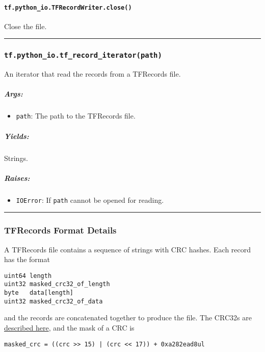 \paragraph{\texorpdfstring{\texttt{tf.python\_io.TFRecordWriter.close()}
}{tf.python\_io.TFRecordWriter.close() }}\label{tf.pythonux5fio.tfrecordwriter.close}

Close the file.

\begin{center}\rule{0.5\linewidth}{\linethickness}\end{center}

\subsubsection{\texorpdfstring{\texttt{tf.python\_io.tf\_record\_iterator(path)}
}{tf.python\_io.tf\_record\_iterator(path) }}\label{tf.pythonux5fio.tfux5frecordux5fiteratorpath}

An iterator that read the records from a TFRecords file.

\subparagraph{Args: }\label{args-2}

\begin{itemize}
\tightlist
\item
  \texttt{path}: The path to the TFRecords file.
\end{itemize}

\subparagraph{Yields: }\label{yields}

Strings.

\subparagraph{Raises: }\label{raises-1}

\begin{itemize}
\tightlist
\item
  \texttt{IOError}: If \texttt{path} cannot be opened for reading.
\end{itemize}

\begin{center}\rule{0.5\linewidth}{\linethickness}\end{center}

\subsubsection{TFRecords Format Details
}\label{tfrecords-format-details}

A TFRecords file contains a sequence of strings with CRC hashes. Each
record has the format

\begin{verbatim}
uint64 length
uint32 masked_crc32_of_length
byte   data[length]
uint32 masked_crc32_of_data
\end{verbatim}

and the records are concatenated together to produce the file. The
CRC32s are
\href{https://en.wikipedia.org/wiki/Cyclic_redundancy_check}{described
here}, and the mask of a CRC is

\begin{verbatim}
masked_crc = ((crc >> 15) | (crc << 17)) + 0xa282ead8ul
\end{verbatim}

